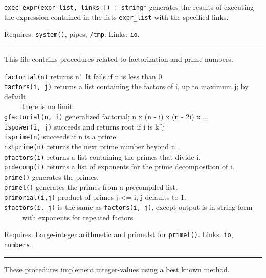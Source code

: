 \texttt{exec\_expr(expr\_list, links[]) : string*} generates the results
of executing the expression contained in the lists \texttt{expr\_list}
with the specified links.

Requires: \texttt{system()}, pipes, \texttt{/tmp}. Links: \texttt{io}.


\vspace{0.25cm}\hrule{}

This file contains procedures related to factorization and prime
numbers.

\texttt{factorial(n)} returns n!. It fails if n is
less than 0.\\
\texttt{factors(i, j)} returns a list containing the factors of i, up to
maximum j; by default\\
 \ \ \ \ \ there is no limit.\\
\texttt{gfactorial(n, i)} generalized factorial; n x (n - i) x (n - 2i)
x ...\\
\texttt{ispower(i, j)} succeeds and returns root if i is k\^{}j\\
\texttt{is}\texttt{prime(n)} succeeds if n is a
prime.\\
\texttt{nxtprime(n)} returns the next prime number beyond n.\\
\texttt{pfactors(i)} returns a list containing the primes that divide
i.\\
\texttt{prdecomp(i)} returns a list of exponents for the prime
decomposition of i.\\
\texttt{prime()} generates the primes.\\
\texttt{primel()} generates the primes from a precompiled list.\\
\texttt{primorial(i,j)} product of primes j {\textless}= i; j defaults
to 1.\\
\texttt{sfactors(i, j)} is the same as \texttt{factors(i, j)}, except
output is in string form\\
 \ \ \ \ \ with exponents for repeated factors

Requires: Large-integer arithmetic and prime.lst for
\texttt{primel()}. Links: \texttt{io}, \texttt{numbers}.

\vspace{0.25cm}\hrule{}

These procedures implement integer-values using a best known method.

